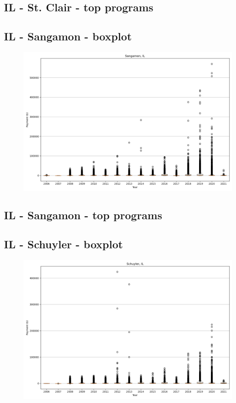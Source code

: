 \subsection*{IL - St. Clair - top programs}

\newpage
\subsection*{IL - Sangamon - boxplot}
\begin{figure}[h]
\centering
\includegraphics[width=7in]{../output/boxplots/counties/Sangamon-IL_boxplot.png}
\end{figure}


\subsection*{IL - Sangamon - top programs}

\newpage
\subsection*{IL - Schuyler - boxplot}
\begin{figure}[h]
\centering
\includegraphics[width=7in]{../output/boxplots/counties/Schuyler-IL_boxplot.png}
\end{figure}


